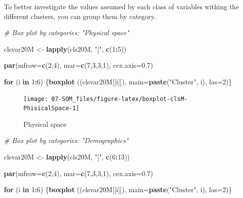 \documentclass[
]{article}
\newenvironment{Shaded}{\begin{snugshade}}{\end{snugshade}}
\newcommand{\AttributeTok}[1]{\textcolor[rgb]{0.13,0.29,0.53}{#1}}
\newcommand{\CommentTok}[1]{\textcolor[rgb]{0.56,0.35,0.01}{\textit{#1}}}
\newcommand{\ControlFlowTok}[1]{\textcolor[rgb]{0.13,0.29,0.53}{\textbf{#1}}}
\newcommand{\DecValTok}[1]{\textcolor[rgb]{0.00,0.00,0.81}{#1}}
\newcommand{\FloatTok}[1]{\textcolor[rgb]{0.00,0.00,0.81}{#1}}
\newcommand{\FunctionTok}[1]{\textcolor[rgb]{0.13,0.29,0.53}{\textbf{#1}}}
\newcommand{\NormalTok}[1]{#1}
\newcommand{\OtherTok}[1]{\textcolor[rgb]{0.56,0.35,0.01}{#1}}
\newcommand{\SpecialCharTok}[1]{\textcolor[rgb]{0.81,0.36,0.00}{\textbf{#1}}}
\newcommand{\StringTok}[1]{\textcolor[rgb]{0.31,0.60,0.02}{#1}}
\begin{document}
To better investigate the values assumed by each class of variables withing the different clusters, you can group them by category.

\begin{Shaded}
\begin{Highlighting}[]
\CommentTok{\# Box plot by categories: "Physical space"}

\NormalTok{clsvar20M }\OtherTok{\textless{}{-}} \FunctionTok{lapply}\NormalTok{(cls20M, }\StringTok{"["}\NormalTok{, }\FunctionTok{c}\NormalTok{(}\DecValTok{1}\SpecialCharTok{:}\DecValTok{5}\NormalTok{)) }

\FunctionTok{par}\NormalTok{(}\AttributeTok{mfrow=}\FunctionTok{c}\NormalTok{(}\DecValTok{2}\NormalTok{,}\DecValTok{4}\NormalTok{), }\AttributeTok{mar=}\FunctionTok{c}\NormalTok{(}\DecValTok{7}\NormalTok{,}\DecValTok{3}\NormalTok{,}\DecValTok{3}\NormalTok{,}\DecValTok{1}\NormalTok{), }\AttributeTok{cex.axis=}\FloatTok{0.7}\NormalTok{)}

\ControlFlowTok{for}\NormalTok{ (i }\ControlFlowTok{in} \DecValTok{1}\SpecialCharTok{:}\DecValTok{6}\NormalTok{) \{}\FunctionTok{boxplot}\NormalTok{ ((clsvar20M[[i]]), }\AttributeTok{main=}\FunctionTok{paste}\NormalTok{(}\StringTok{"Cluster"}\NormalTok{, i),  }\AttributeTok{las=}\DecValTok{2}\NormalTok{)\}}
\end{Highlighting}
\end{Shaded}

\begin{figure}

{\centering \texttt{[image: 07-SOM\_files/figure-latex/boxplot-clsM-PhisicalSpace-1]} 

}

\caption{Physical space}\label{fig:boxplot-clsM-PhisicalSpace}
\end{figure}

\begin{Shaded}
\begin{Highlighting}[]
\CommentTok{\# Box plot by categories: "Demographics"}

\NormalTok{clsvar20M }\OtherTok{\textless{}{-}} \FunctionTok{lapply}\NormalTok{(cls20M, }\StringTok{"["}\NormalTok{, }\FunctionTok{c}\NormalTok{(}\DecValTok{6}\SpecialCharTok{:}\DecValTok{13}\NormalTok{)) }

\FunctionTok{par}\NormalTok{(}\AttributeTok{mfrow=}\FunctionTok{c}\NormalTok{(}\DecValTok{2}\NormalTok{,}\DecValTok{4}\NormalTok{), }\AttributeTok{mar=}\FunctionTok{c}\NormalTok{(}\DecValTok{7}\NormalTok{,}\DecValTok{3}\NormalTok{,}\DecValTok{3}\NormalTok{,}\DecValTok{1}\NormalTok{), }\AttributeTok{cex.axis=}\FloatTok{0.7}\NormalTok{)}

\ControlFlowTok{for}\NormalTok{ (i }\ControlFlowTok{in} \DecValTok{1}\SpecialCharTok{:}\DecValTok{6}\NormalTok{) \{}\FunctionTok{boxplot}\NormalTok{ ((clsvar20M[[i]]), }\AttributeTok{main=}\FunctionTok{paste}\NormalTok{(}\StringTok{"Cluster"}\NormalTok{, i),  }\AttributeTok{las=}\DecValTok{2}\NormalTok{)\}}
\end{Highlighting}
\end{Shaded}
\end{document}
